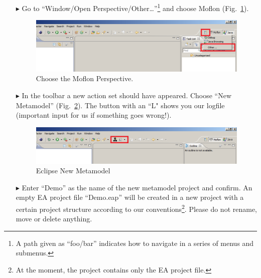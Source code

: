 \begin{enumerate}
\item[$\blacktriangleright$] Go to ``Window/Open
Perspective/Other\ldots''\footnote{A path given as ``foo/bar'' indicates how to
navigate in a series of menus and submenus.} and choose Moflon
(Fig.~\ref{fig_eclipse}). \begin{figure}[htbp]
	\centering
  \includegraphics[width=\textwidth]{pics/installationAndSetup/eclipse_firststart.png}
	\caption{Choose the Moflon Perspective.}
	\label{fig_eclipse}
\end{figure}

\item[$\blacktriangleright$] In the toolbar a new action set should have
appeared. Choose ``New Metamodel'' (Fig.~\ref{fig_eclipseNewMetamodel}).
The button with an ``L" shows you our logfile (important input for us if
something goes wrong!).
\begin{figure}[htbp]
	\centering
  \includegraphics[width=\textwidth]{pics/installationAndSetup/eclipse_metamodelButton.png}
	\caption{Eclipse New Metamodel}
	\label{fig_eclipseNewMetamodel}
\end{figure}

\item[$\blacktriangleright$] Enter ``Demo'' as the name of the new metamodel
project and confirm. 
An empty EA project file ``Demo.eap'' will be
created in a new project with a certain project structure
according to our conventions\footnote{At the moment, the project contains only the EA project file.}.
Please do not rename, move or delete anything.


\end{enumerate}
